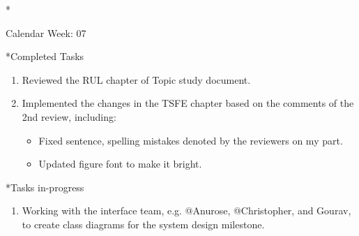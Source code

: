 \documentclass[11pt,a4paper]{article}
\begin{document}
\newpage
\begin{section}*{Calendar Week: 07 \hfill \date{19 February, 2021}}
 \begin{subsection}*{Completed Tasks}
     \begin{enumerate}
         \item
               Reviewed the RUL chapter of Topic study document.
         \item
               Implemented the changes in the TSFE chapter based on the comments of the 2nd review, including:
               \begin{itemize}
                   \item
                         Fixed sentence, spelling mistakes denoted by the reviewers on my part.
                   \item
                         Updated figure font to make it bright.
               \end{itemize}
     \end{enumerate}
 \end{subsection}

 \begin{subsection}*{Tasks in-progress}
     \begin{enumerate}
         \item
               Working with the interface team, e.g. @Anurose, @Christopher, and Gourav, to create class diagrams for the system design milestone.
     \end{enumerate}
 \end{subsection}
\end{section}
\end{document}
